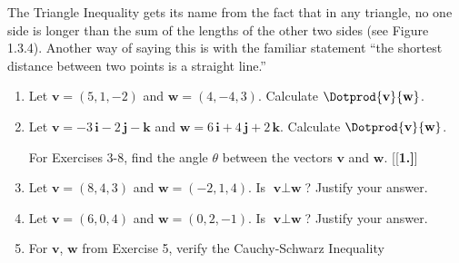 \piccaption[]{}
\par The Triangle Inequality gets its name from the fact that in any triangle, no one side is longer than the sum of
the lengths of the other two sides (see Figure 1.3.4). Another way of saying this is with the familiar statement ``the
shortest distance between two points is a straight line.''

\vspace{-6mm}
\startexercises\label{ssec1dot3}
\begin{enumerate}[\bfseries 1.]
 \item Let $\textbf{v} = (5,1,-2)$ and $\textbf{w} = (4,-4,3)$. Calculate $\Dotprod{\textbf{v}}{\textbf{w}}$.
 \item Let $\textbf{v} = -3\,\textbf{i} - 2\,\textbf{j} - \textbf{k}$ and
  $\textbf{w} = 6\,\textbf{i} + 4\,\textbf{j} + 2\,\textbf{k}$. Calculate $\Dotprod{\textbf{v}}{\textbf{w}}$.
\par\noindent For Exercises 3-8, find the angle $\theta$ between the vectors $\textbf{v}$ and $\textbf{w}$.
[{[\bfseries 1.]}]
 \item Let $\textbf{v} = (8,4,3)$ and $\textbf{w} = (-2,1,4)$. Is $\textbf{v} \perp \textbf{w}$? Justify your answer.
 \item Let $\textbf{v} = (6,0,4)$ and $\textbf{w} = (0,2,-1)$. Is $\textbf{v} \perp \textbf{w}$? Justify your answer.
 \item For $\textbf{v}$, $\textbf{w}$ from Exercise 5, verify the Cauchy-Schwarz Inequality

\end{enumerate}
